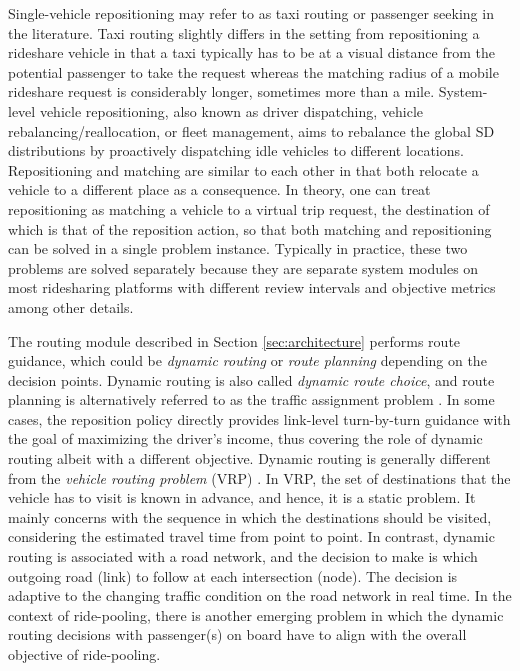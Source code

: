 \documentclass{article}
\newcommand{\tq}[1]{\textcolor{red}{#1}}
\begin{document}
Single-vehicle repositioning may refer to as taxi routing or passenger seeking in the literature.
Taxi routing slightly differs in the setting from repositioning a rideshare vehicle in that a taxi typically has to be at a visual distance from the potential passenger to take the request whereas the matching radius of a mobile rideshare request is considerably longer, sometimes more than a mile. System-level vehicle repositioning, also known as driver dispatching, vehicle rebalancing/reallocation, or fleet management, aims to rebalance the global SD distributions by proactively dispatching idle vehicles to different locations. 
Repositioning and matching are similar to each other in that both relocate a vehicle to a different place as a consequence. In theory, one can treat repositioning as matching a vehicle to a virtual trip request, the destination of which is that of the reposition action, so that both matching and repositioning can be solved in a single problem instance. Typically in practice, these two problems are solved separately because they are separate system modules on most ridesharing platforms with different review intervals and objective metrics among other details. 


The routing module described in Section \ref{sec:architecture} performs route guidance, which could be \emph{dynamic routing} or \emph{route planning} depending on the decision points. Dynamic routing is also called  \emph{dynamic route choice}, and route planning is alternatively referred to as the traffic assignment problem \citep{shou2020multi}. 
In some cases, the reposition policy directly provides link-level turn-by-turn guidance with the goal of maximizing the driver's income, thus covering the role of dynamic routing albeit with a different objective. 
Dynamic routing is generally different from the \emph{vehicle routing problem} (VRP) \citep{dantzig1959truck}. In VRP, the set of destinations that the vehicle has to visit is known in advance, and hence, it is a static problem. It mainly concerns with the sequence in which the destinations should be visited, considering the estimated travel time from point to point. In contrast, dynamic routing is associated with a road network, and the decision to make is which outgoing road (link) to follow at each intersection (node). The decision is adaptive to the changing traffic condition on the road network in real time. In the context of ride-pooling, there is another emerging problem in which the dynamic routing decisions with passenger(s) on board have to align with the overall objective of ride-pooling.
\end{document}
